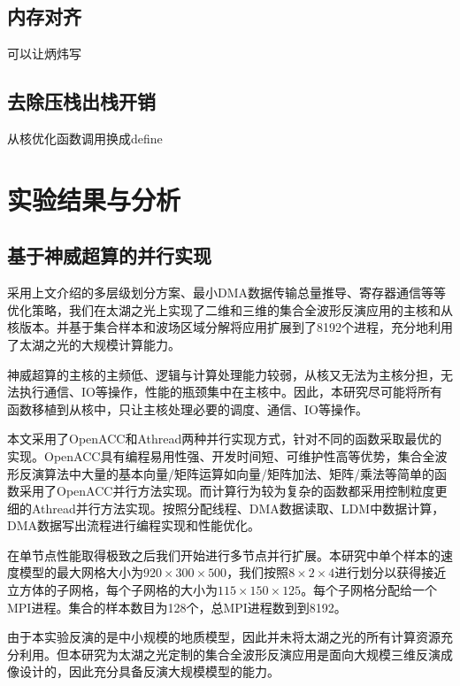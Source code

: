 \documentclass[degree=doctor]{thuthesis}
\begin{document}
\subsection{内存对齐}
可以让炳炜写


\subsection{去除压栈出栈开销}
从核优化函数调用换成define




\section{实验结果与分析} %
\label{sec:实验结果与分析}

\subsection{基于神威超算的并行实现}

采用上文介绍的多层级划分方案、最小DMA数据传输总量推导、寄存器通信等等优化策略，我们在太湖之光上实现了二维和三维的集合全波形反演应用的主核和从核版本。并基于集合样本和波场区域分解将应用扩展到了8192个进程，充分地利用了太湖之光的大规模计算能力。

神威超算的主核的主频低、逻辑与计算处理能力较弱，从核又无法为主核分担，无法执行通信、IO等操作，性能的瓶颈集中在主核中。因此，本研究尽可能将所有函数移植到从核中，只让主核处理必要的调度、通信、IO等操作。

本文采用了OpenACC和Athread两种并行实现方式，针对不同的函数采取最优的实现。OpenACC具有编程易用性强、开发时间短、可维护性高等优势，集合全波形反演算法中大量的基本向量/矩阵运算如向量/矩阵加法、矩阵/乘法等简单的函数采用了OpenACC并行方法实现。而计算行为较为复杂的函数都采用控制粒度更细的Athread并行方法实现。按照分配线程、DMA数据读取、LDM中数据计算，DMA数据写出流程进行编程实现和性能优化。

在单节点性能取得极致之后我们开始进行多节点并行扩展。本研究中单个样本的速度模型的最大网格大小为$920\times 300 \times 500$，我们按照$8\times 2 \times 4$进行划分以获得接近立方体的子网格，每个子网格的大小为$115\times150\times125$。每个子网格分配给一个MPI进程。集合的样本数目为128个，总MPI进程数到到8192。

由于本实验反演的是中小规模的地质模型，因此并未将太湖之光的所有计算资源充分利用。但本研究为太湖之光定制的集合全波形反演应用是面向大规模三维反演成像设计的，因此充分具备反演大规模模型的能力。
\end{document}
